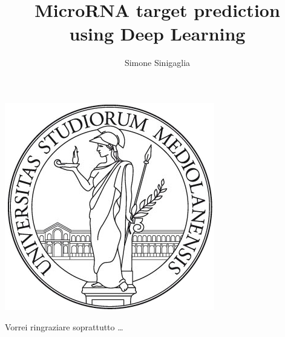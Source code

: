 \documentclass[
12pt, %
english, %
]{report} %
\begin{document}
	
	\title{MicroRNA target prediction \\
		using Deep Learning}
	\author{Simone Sinigaglia}
	
	\begin{center}
		\includegraphics{Figures/logo_unimi}\\[1cm]
	\end{center}
	
	\beforepreface
	Vorrei ringraziare soprattutto \dots
	\afterpreface
	
	
	
%
%

	
	

%
%
	
	\appendix %
	

%

	
	

\end{document}

